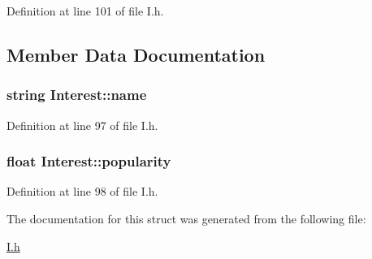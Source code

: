 \-Definition at line 101 of file \-I.\-h.



\subsection{\-Member \-Data \-Documentation}
\hypertarget{structInterest_a9da31ac749fa5567497efa03a4bcec5a}{
\subsubsection[{name}]{\setlength{\rightskip}{0pt plus 5cm}string {\bf \-Interest\-::name}}}\label{structInterest_a9da31ac749fa5567497efa03a4bcec5a}


\-Definition at line 97 of file \-I.\-h.

\hypertarget{structInterest_ac434ddafeb056a3ee3aa7081d2c8eb6e}{
\subsubsection[{popularity}]{\setlength{\rightskip}{0pt plus 5cm}float {\bf \-Interest\-::popularity}}}\label{structInterest_ac434ddafeb056a3ee3aa7081d2c8eb6e}


\-Definition at line 98 of file \-I.\-h.



\-The documentation for this struct was generated from the following file\-:\begin{DoxyCompactItemize}
\item 
\hyperlink{I_8h}{\-I.\-h}\end{DoxyCompactItemize}
